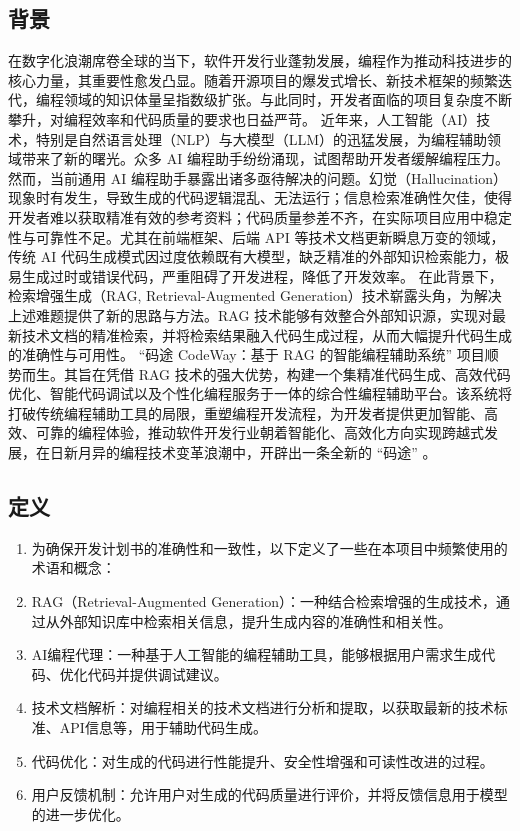 \documentclass[
    report,     %
    oneside,    %
    UTF8,       %
    zihao=-4    %
]{config} %
\begin{document}
\subsection{背景}
在数字化浪潮席卷全球的当下，软件开发行业蓬勃发展，编程作为推动科技进步的核心力量，其重要性愈发凸显。随着开源项目的爆发式增长、新技术框架的频繁迭代，编程领域的知识体量呈指数级扩张。与此同时，开发者面临的项目复杂度不断攀升，对编程效率和代码质量的要求也日益严苛。
近年来，人工智能（AI）技术，特别是自然语言处理（NLP）与大模型（LLM）的迅猛发展，为编程辅助领域带来了新的曙光。众多 AI 编程助手纷纷涌现，试图帮助开发者缓解编程压力。然而，当前通用 AI 编程助手暴露出诸多亟待解决的问题。幻觉（Hallucination）现象时有发生，导致生成的代码逻辑混乱、无法运行；信息检索准确性欠佳，使得开发者难以获取精准有效的参考资料；代码质量参差不齐，在实际项目应用中稳定性与可靠性不足。尤其在前端框架、后端 API 等技术文档更新瞬息万变的领域，传统 AI 代码生成模式因过度依赖既有大模型，缺乏精准的外部知识检索能力，极易生成过时或错误代码，严重阻碍了开发进程，降低了开发效率。
在此背景下，检索增强生成（RAG, Retrieval-Augmented Generation）技术崭露头角，为解决上述难题提供了新的思路与方法。RAG 技术能够有效整合外部知识源，实现对最新技术文档的精准检索，并将检索结果融入代码生成过程，从而大幅提升代码生成的准确性与可用性。
“码途 CodeWay：基于 RAG 的智能编程辅助系统” 项目顺势而生。其旨在凭借 RAG 技术的强大优势，构建一个集精准代码生成、高效代码优化、智能代码调试以及个性化编程服务于一体的综合性编程辅助平台。该系统将打破传统编程辅助工具的局限，重塑编程开发流程，为开发者提供更加智能、高效、可靠的编程体验，推动软件开发行业朝着智能化、高效化方向实现跨越式发展，在日新月异的编程技术变革浪潮中，开辟出一条全新的 “码途” 。
\subsection{定义}
\begin{enumerate}
    \item 为确保开发计划书的准确性和一致性，以下定义了一些在本项目中频繁使用的术语和概念：
    \item RAG（Retrieval-Augmented Generation）：一种结合检索增强的生成技术，通过从外部知识库中检索相关信息，提升生成内容的准确性和相关性。
    \item AI编程代理：一种基于人工智能的编程辅助工具，能够根据用户需求生成代码、优化代码并提供调试建议。
    \item 技术文档解析：对编程相关的技术文档进行分析和提取，以获取最新的技术标准、API信息等，用于辅助代码生成。
    \item 代码优化：对生成的代码进行性能提升、安全性增强和可读性改进的过程。
    \item 用户反馈机制：允许用户对生成的代码质量进行评价，并将反馈信息用于模型的进一步优化。
\end{enumerate}
    
\end{document}
